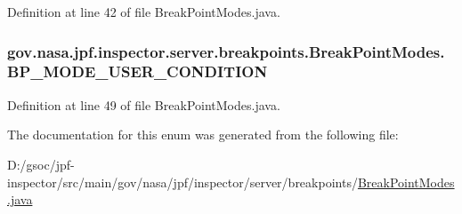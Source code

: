 Definition at line 42 of file Break\+Point\+Modes.\+java.

\subsubsection[{\texorpdfstring{B\+P\+\_\+\+M\+O\+D\+E\+\_\+\+U\+S\+E\+R\+\_\+\+C\+O\+N\+D\+I\+T\+I\+ON}{BP_MODE_USER_CONDITION}}]{\setlength{\rightskip}{0pt plus 5cm}gov.\+nasa.\+jpf.\+inspector.\+server.\+breakpoints.\+Break\+Point\+Modes.\+B\+P\+\_\+\+M\+O\+D\+E\+\_\+\+U\+S\+E\+R\+\_\+\+C\+O\+N\+D\+I\+T\+I\+ON}\hypertarget{enumgov_1_1nasa_1_1jpf_1_1inspector_1_1server_1_1breakpoints_1_1_break_point_modes_a1a6b6b98e5e77a0d6647a86862118013}{}\label{enumgov_1_1nasa_1_1jpf_1_1inspector_1_1server_1_1breakpoints_1_1_break_point_modes_a1a6b6b98e5e77a0d6647a86862118013}


Definition at line 49 of file Break\+Point\+Modes.\+java.



The documentation for this enum was generated from the following file\+:\begin{DoxyCompactItemize}
\item 
D\+:/gsoc/jpf-\/inspector/src/main/gov/nasa/jpf/inspector/server/breakpoints/\hyperlink{_break_point_modes_8java}{Break\+Point\+Modes.\+java}\end{DoxyCompactItemize}
